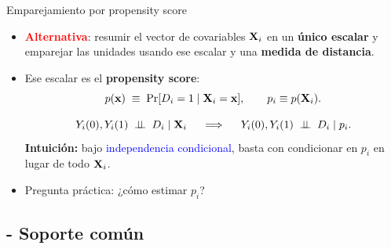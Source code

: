 \documentclass[10pt, xcolor=dvipsnames]{beamer}
\begin{document}
\begin{frame}{Emparejamiento por propensity score}\label{DIAP:PS}
\begin{itemize}
    \item \textcolor{red}{\textbf{Alternativa}}: resumir el vector de covariables \(\textbf{X}_i\) en un \textbf{único escalar} y emparejar las unidades usando ese escalar y una \textbf{medida de distancia}. %
    \smallspace
    \item Ese escalar es el \textbf{propensity score}:
    \[
        p(\textbf{x}) \;\equiv\; \Pr[D_i=1 \mid \textbf{X}_i = \textbf{x}], \qquad p_i \equiv p(\textbf{X}_i).
    \]
    \vspace{-1.5em}
    \begin{tcolorbox}[colback=white, title=Teorema del propensity score \citep{rosenbaum1983}, arc=0mm,boxrule=0.5pt, breakable]
        \vspace{-1.5em}
        \[
            Y_i(0), Y_i(1) \;\perp \!\!\! \perp\; D_i \mid \textbf{X}_i 
            \;\;\;\;\implies\;\;\;\; 
            Y_i(0), Y_i(1) \;\perp \!\!\! \perp\; D_i \mid p_i.
        \]
        \textbf{Intuición:} bajo \textcolor{blue}{independencia condicional}, basta con condicionar en \(p_i\) en lugar de todo \(\textbf{X}_i\). \hyperlink{Demostracion-PS}{{}}
    \end{tcolorbox}
    \item Pregunta práctica: ¿cómo estimar \(p_i\)?
\end{itemize}
\end{frame}


\subsection{- Soporte común}
\end{document}
